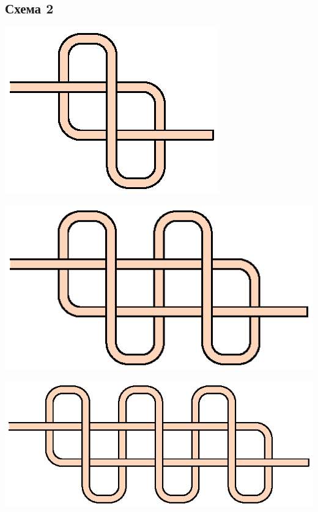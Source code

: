 \subsection{Схема 2}
\graphicspath{{\currentpath}}

\includegraphics{images/s-02-a0.eps}

\includegraphics{images/s-02-a1.eps}

\includegraphics{images/s-02-a2.eps}